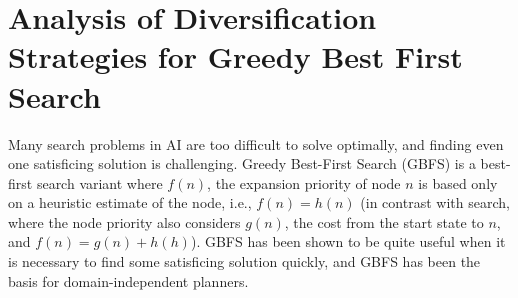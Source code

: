 


\chapter{Analysis of Diversification Strategies for Greedy Best First Search}

Many search problems in AI are too difficult to solve optimally, and finding even one satisficing solution is challenging. 
Greedy Best-First Search (GBFS) is a best-first search variant where $f(n)$, the expansion priority of node $n$ is based only on a heuristic estimate of the node, i.e., $f(n) = h(n)$  (in contrast with \astar search, where the node priority also considers $g(n)$, the cost from the start state to $n$, and $f(n) = g(n)+h(h)$).
GBFS has been shown to be quite useful when it is necessary to find some  satisficing solution quickly, and GBFS 
has been the basis for \lsota domain-independent planners. %

